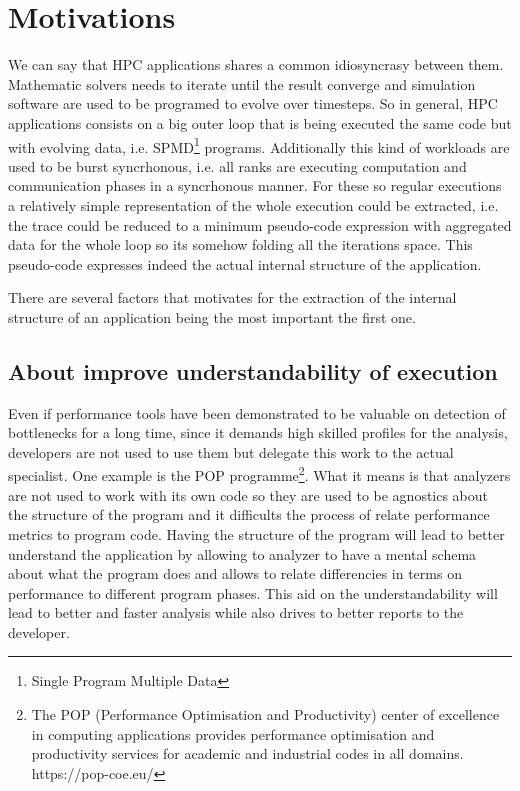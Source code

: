 \section{Motivations}\label{s:motivations}

We can say that HPC applications shares a common idiosyncrasy between them. 
Mathematic solvers needs to iterate until the result converge and 
simulation software are used to be programed to evolve over timesteps. So in 
general, HPC applications consists on a big outer loop that is being executed the 
same code but with evolving data, i.e. SPMD\footnote{Single
Program Multiple Data} programs. Additionally this kind of workloads are used
to be burst syncrhonous, i.e. all ranks are executing computation and
communication phases in a syncrhonous manner. For these so regular executions a
relatively simple representation of the whole execution could be extracted, i.e.
the trace could be reduced to a minimum pseudo-code expression
with aggregated data for the whole loop so its somehow folding all the iterations
space. This pseudo-code expresses indeed the actual internal structure of the 
application.

There are several factors that motivates for the extraction of the internal
structure of an application being the most important the first one.


\subsection{About improve understandability of execution}

Even if performance tools have been demonstrated to be valuable on detection of
bottlenecks for a long time, since it demands high skilled profiles for the
analysis, developers are not used to use them but delegate this work to the
actual specialist. One example is the POP programme\footnote{The POP
  (Performance Optimisation and Productivity) center of excellence in computing
  applications provides performance optimisation and productivity services for
academic and industrial codes in all domains. https://pop-coe.eu/}. What it
means is that analyzers are not used to work with its own code so they are used
to be agnostics about the structure of the program and it difficults the process
of relate performance metrics to program code. Having the structure of the
program will lead to better understand the application by allowing to analyzer
to have a mental schema about what the program does and allows to relate
differencies in terms on performance to different program phases. This aid on
the understandability will lead to better and faster analysis while also drives
to better reports to the developer.

